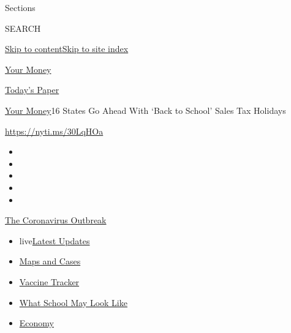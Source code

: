 Sections

SEARCH

\protect\hyperlink{site-content}{Skip to
content}\protect\hyperlink{site-index}{Skip to site index}

\href{https://www.nytimes3xbfgragh.onion/section/your-money}{Your Money}

\href{https://myaccount.nytimes3xbfgragh.onion/auth/login?response_type=cookie\&client_id=vi}{}

\href{https://www.nytimes3xbfgragh.onion/section/todayspaper}{Today's
Paper}

\href{/section/your-money}{Your Money}\textbar{}16 States Go Ahead With
`Back to School' Sales Tax Holidays

\url{https://nyti.ms/30LqHOa}

\begin{itemize}
\item
\item
\item
\item
\item
\end{itemize}

\href{https://www.nytimes3xbfgragh.onion/news-event/coronavirus?action=click\&pgtype=Article\&state=default\&region=TOP_BANNER\&context=storylines_menu}{The
Coronavirus Outbreak}

\begin{itemize}
\tightlist
\item
  live\href{https://www.nytimes3xbfgragh.onion/2020/08/01/world/coronavirus-covid-19.html?action=click\&pgtype=Article\&state=default\&region=TOP_BANNER\&context=storylines_menu}{Latest
  Updates}
\item
  \href{https://www.nytimes3xbfgragh.onion/interactive/2020/us/coronavirus-us-cases.html?action=click\&pgtype=Article\&state=default\&region=TOP_BANNER\&context=storylines_menu}{Maps
  and Cases}
\item
  \href{https://www.nytimes3xbfgragh.onion/interactive/2020/science/coronavirus-vaccine-tracker.html?action=click\&pgtype=Article\&state=default\&region=TOP_BANNER\&context=storylines_menu}{Vaccine
  Tracker}
\item
  \href{https://www.nytimes3xbfgragh.onion/interactive/2020/07/29/us/schools-reopening-coronavirus.html?action=click\&pgtype=Article\&state=default\&region=TOP_BANNER\&context=storylines_menu}{What
  School May Look Like}
\item
  \href{https://www.nytimes3xbfgragh.onion/live/2020/07/31/business/stock-market-today-coronavirus?action=click\&pgtype=Article\&state=default\&region=TOP_BANNER\&context=storylines_menu}{Economy}
\end{itemize}

